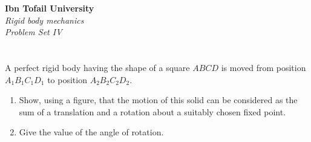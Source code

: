\documentclass[12pt]{article}
\begin{document}
\begin{center}
\Large\textbf{Ibn Tofail University} \\[1em]
\large\textit{Rigid body mechanics} \\[2em]
\large\textit{Problem Set IV} \\[0.5em]
\end{center}

\vspace{1cm}

\section{}

A perfect rigid body having the shape of a square $ABCD$ is moved from position $A_1B_1C_1D_1$ to position $A_2B_2C_2D_2$.

\begin{enumerate}
    \item Show, using a figure, that the motion of this solid can be considered as the sum of a translation and a rotation about a suitably chosen fixed point.
    \item Give the value of the angle of rotation.
\end{enumerate}
\end{document}

